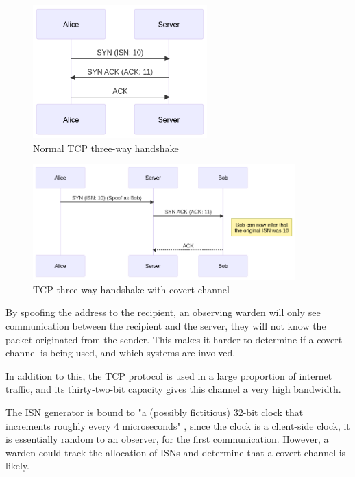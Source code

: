 \begin{figure}[!h]
    \centering
    \includegraphics[width=0.6\textwidth]{fig/TCPACKNormal.png}
    \caption{Normal TCP three-way handshake}
    \label{fig:TCPACKNormal}
\end{figure}

\begin{figure}[!h]
    \centering
    \includegraphics[width=0.9\textwidth]{fig/TCPACKCC.png}
    \caption{TCP three-way handshake with covert channel}
    \label{fig:TCPACKCC}
\end{figure}


By spoofing the address to the recipient, an observing warden will only see communication between the recipient and the server, they will not know the packet originated from the sender. This makes it harder to determine if a covert channel is being used, and which systems are involved.

In addition to this, the TCP protocol is used in a large proportion of internet traffic, and its thirty-two-bit capacity gives this channel a very high bandwidth.

The ISN generator is bound to "a (possibly fictitious) 32-bit clock that increments roughly every 4 microseconds" \citep{Trfc793}, since the clock is a client-side clock, it is essentially random to an observer, for the first communication. However, a warden could track the allocation of ISNs and determine that a covert channel is likely.

